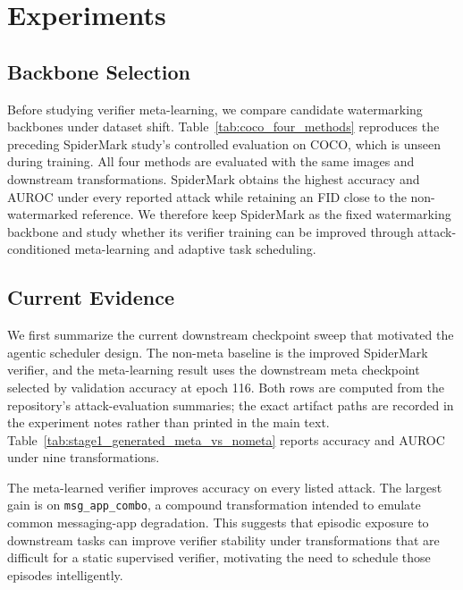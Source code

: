 \section{Experiments}
\label{sec:experiments}

\subsection{Backbone Selection}

Before studying verifier meta-learning, we compare candidate watermarking backbones under dataset shift.
Table~\ref{tab:coco_four_methods} reproduces the preceding SpiderMark study's controlled evaluation on COCO, which is unseen during training.
All four methods are evaluated with the same images and downstream transformations.
SpiderMark obtains the highest accuracy and AUROC under every reported attack while retaining an FID close to the non-watermarked reference.
We therefore keep SpiderMark as the fixed watermarking backbone and study whether its verifier training can be improved through attack-conditioned meta-learning and adaptive task scheduling.



\subsection{Current Evidence}

We first summarize the current downstream checkpoint sweep that motivated the agentic scheduler design.
The non-meta baseline is the improved SpiderMark verifier, and the meta-learning result uses the downstream meta checkpoint selected by validation accuracy at epoch 116.
Both rows are computed from the repository's attack-evaluation summaries; the exact artifact paths are recorded in the experiment notes rather than printed in the main text.
Table~\ref{tab:stage1_generated_meta_vs_nometa} reports accuracy and AUROC under nine transformations.



The meta-learned verifier improves accuracy on every listed attack.
The largest gain is on \texttt{msg\_app\_combo}, a compound transformation intended to emulate common messaging-app degradation.
This suggests that episodic exposure to downstream tasks can improve verifier stability under transformations that are difficult for a static supervised verifier, motivating the need to schedule those episodes intelligently.

